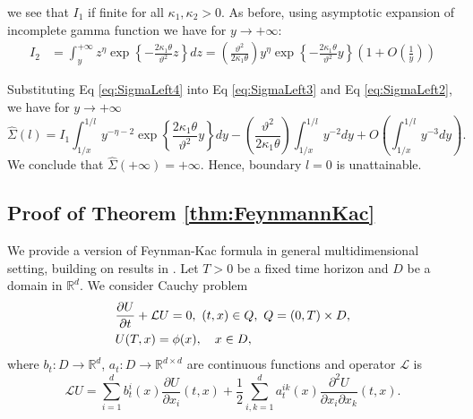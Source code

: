 \documentclass[pdftex,11pt,a4paper] {article}
\begin{document}
we see that $I_1$ if finite for all $\kappa_1, \kappa_2>0$. 
As before, using asymptotic expansion of incomplete gamma function we have for $y\to +\infty$:
\begin{equation}\label{eq:SigmaLeft4}
\begin{split}
I_2&=\int_y^{+\infty}z^{\eta}\exp\left\{-\frac{2\kappa_1\theta}{\vartheta^2}z\right\}dz
=\left(\frac{\vartheta^2}{2\kappa_1\theta}\right)y^{\eta}\exp\left\{-\frac{2\kappa_1\theta}{\vartheta^2}y\right\}\left(1+O\left(\frac{1}{y}\right)\right)
\end{split}
\end{equation}

Substituting Eq \eqref{eq:SigmaLeft4} into Eq \eqref{eq:SigmaLeft3} and Eq \eqref{eq:SigmaLeft2}, we have for $y\to +\infty$
\begin{equation*}
\widehat\Sigma(l)=I_1
\int_{1/x}^{1/l}y^{-\eta-2}\exp\left\{\frac{2\kappa_1\theta}{\vartheta^2}y\right\}dy-
\left(\frac{\vartheta^2}{2\kappa_1\theta}\right)\int_{1/x}^{1/l}y^{-2}dy+O\left(\int_{1/x}^{1/l}y^{-3}dy\right).
\end{equation*}
We conclude that $\widehat\Sigma(+\infty)=+\infty$. Hence, boundary $l=0$ is unattainable. 



\subsection{Proof of Theorem \ref{thm:FeynmannKac}}\label{app:FeynmanKac}

We provide a version of Feynman-Kac formula in general multidimensional setting, building on results in \cite{Heath2000}. Let $T>0$ be a fixed time horizon and $D$ be a domain in $\mathbb{R}^d$. We consider Cauchy problem
\begin{equation}\label{app:Cauchy_prob}
\begin{split}
& \frac{\partial U}{\partial t}+\mathcal{L}U=0, \ (t,x)\in Q, \  Q=(0,T)\times D,\\
& U(T,x)=\phi(x), \quad x\in D,\vspace*{-1.0\baselineskip}
\end{split}
\end{equation}
where $b_t: D\to \mathbb{R}^d$,  $a_t: D\to \mathbb{R}^{d\times d}$ are continuous functions and operator $\mathcal{L}$ is
\begin{equation}\label{eq:fc_generator}
\mathcal{L}U=\sum_{i=1}^d b_t^i(x)\frac{\partial U}{\partial x_i}(t,x) + \frac{1}{2}\sum_{i,k=1}^d a_t^{ik}(x)\frac{\partial^2 U}{\partial x_i\partial x_k}(t,x).
\end{equation}
\end{document}

